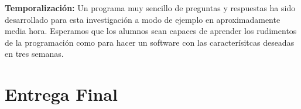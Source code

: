 \documentclass[palatino,nochap]{apuntesURJC}
\begin{document}
\textbf{Temporalización:}
\label{tiempos}
Un programa muy sencillo de preguntas y respuestas ha sido desarrollado para esta investigación a modo de ejemplo en aproximadamente media hora.
%
Esperamos que los alumnos sean capaces de aprender los rudimentos de la programación como para hacer un software con las caracterísitcas deseadas en tres semanas.



\section{Entrega Final}




\printindex
\end{document}
